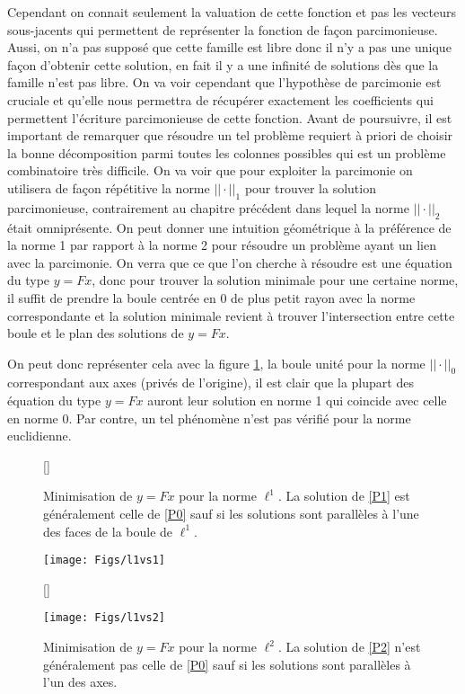 Cependant on connait seulement la valuation de cette fonction et pas les vecteurs sous-jacents qui permettent de représenter la fonction de façon parcimonieuse.
Aussi, on n'a pas supposé que cette famille est libre donc il n'y a pas une unique façon d'obtenir cette solution, en fait il y a une infinité de solutions dès que la famille n'est pas libre.
On va voir cependant que l'hypothèse de parcimonie est cruciale et qu'elle nous permettra de récupérer exactement les coefficients qui permettent l'écriture parcimonieuse de cette fonction.
\newline
Avant de poursuivre, il est important de remarquer que résoudre un tel problème requiert à priori de choisir la bonne décomposition parmi toutes les colonnes possibles qui est un problème combinatoire très difficile.
On va voir que pour exploiter la parcimonie on utilisera de façon répétitive la norme $||\cdot||_1$ pour trouver la solution parcimonieuse, contrairement au chapitre précédent dans lequel la norme $||\cdot||_2$ était omniprésente.
On peut donner une intuition géométrique à la préférence de la norme 1 par rapport à la norme 2 pour résoudre un problème ayant un lien avec la parcimonie.
On verra que ce que l'on cherche à résoudre est une équation du type $y=Fx$, donc pour trouver la solution minimale pour une certaine norme, il suffit de prendre la boule centrée en 0 de plus petit rayon avec la norme correspondante et la solution minimale revient à trouver l'intersection entre cette boule et le plan des solutions de $y=Fx$.


On peut donc représenter cela avec la figure \ref{fig:compball}, la boule unité pour la norme $||\cdot||_0$ correspondant aux axes (privés de l'origine), il est clair que la plupart des équation du type $y=Fx$ auront leur solution en norme 1 qui coincide avec celle en norme 0.
Par contre, un tel phénomène n'est pas vérifié pour la norme euclidienne.
	\begin{figure}[h]\label{fig:compball}
		[\FBwidth]
		{\caption{Minimisation de $y=Fx$ pour la norme $\ell^1$. La solution de \ref{P1} est généralement celle de \ref{P0} sauf si les solutions sont parallèles à l'une des faces de la boule de $\ell^1$.}}
		{\texttt{[image: Figs/l1vs1]}}

		[\FBwidth]
		{\caption{Minimisation de $y=Fx$ pour la norme $\ell^2$. La solution de \ref{P2} n'est généralement pas celle de \ref{P0} sauf si les solutions sont parallèles à l'un des axes.}}
		{\texttt{[image: Figs/l1vs2]}}
	
	\end{figure}


